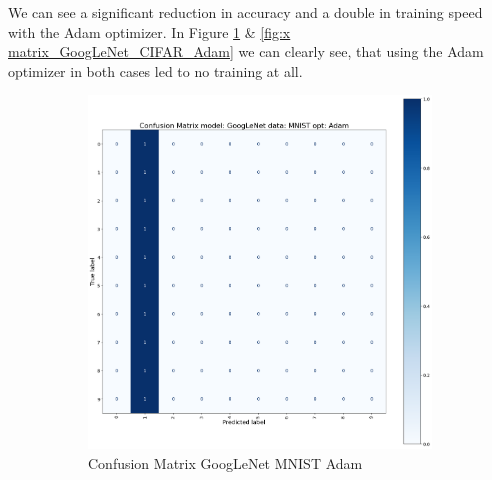 \documentclass[conference]{IEEEtran}
\begin{document}
We can see a significant reduction in accuracy and a double in training speed with the Adam optimizer.
In Figure \ref{fig:x imatrix_GoogLeNet_MNIST_Adam} \& \ref{fig:x matrix_GoogLeNet_CIFAR_Adam} we can clearly see, that using the Adam optimizer in both cases led to no training at all.

\begin{figure}[!htbp]
    \centering
    \begin{subfigure}[b]{0.22\textwidth}
        \centering
        \includegraphics[width=\textwidth]{img/matrx_GoogLeNet_MNIST_Adam.png}
        \caption{Confusion Matrix GoogLeNet MNIST Adam}
        \label{fig:x imatrix_GoogLeNet_MNIST_Adam}
    \end{subfigure}
    \hfill
    \begin{subfigure}[b]{0.22\textwidth}
        \centering

\end{subfigure}
\end{figure}
\end{document}
